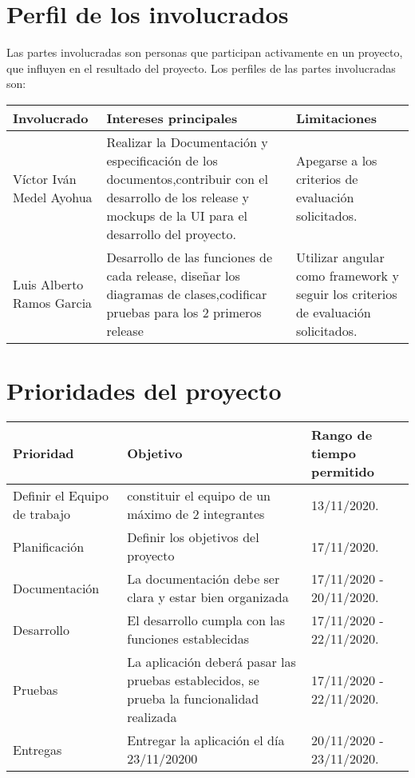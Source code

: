 \documentclass[12pt,a4paper]{book}
\begin{document}
\section{Perfil de los involucrados}
Las partes involucradas son personas que participan activamente en un proyecto, que influyen en el resultado del proyecto. Los perfiles de las partes involucradas son:
\begin{table}[h!]
\begin{tabular}{|p{5 cm}|p{5 cm}|p{5 cm}|}
\hline
\textbf{Involucrado}&\textbf{Intereses principales}&\textbf{Limitaciones}
\\\hline

Víctor Iván Medel Ayohua &Realizar la Documentación y especificación de los documentos,contribuir con el desarrollo de los release y mockups de la UI para el desarrollo del proyecto.&Apegarse a los criterios de evaluación solicitados.\\\hline

Luis Alberto Ramos Garcia&Desarrollo de las funciones de cada release, diseñar los diagramas de clases,codificar pruebas para los 2 primeros release & Utilizar angular como framework y seguir los criterios de evaluación solicitados.\\\hline
\end{tabular}
\end{table}
\newpage
\section{Prioridades del proyecto}
\vspace{0.5 cm}
\begin{table}[h!]
\begin{tabular}{|p{5 cm}|p{5 cm}|p{5 cm}|}
\hline
\textbf{Prioridad}&\textbf{Objetivo}&\textbf{Rango de tiempo permitido}
\\\hline
Definir el Equipo de trabajo&constituir el equipo de un máximo de 2 integrantes& 13/11/2020.\\\hline
Planificación&Definir los objetivos del proyecto & 17/11/2020.\\\hline
Documentación&La documentación debe ser clara y estar bien organizada& 17/11/2020 - 20/11/2020.\\\hline
Desarrollo&El desarrollo cumpla con las funciones establecidas& 17/11/2020 - 22/11/2020.\\\hline
Pruebas&La aplicación deberá pasar las pruebas establecidos, se prueba la funcionalidad realizada& 17/11/2020 - 22/11/2020.\\\hline
Entregas&Entregar la aplicación el día 23/11/20200 & 20/11/2020 - 23/11/2020.\\\hline
\end{tabular}
\end{table}
\end{document}
